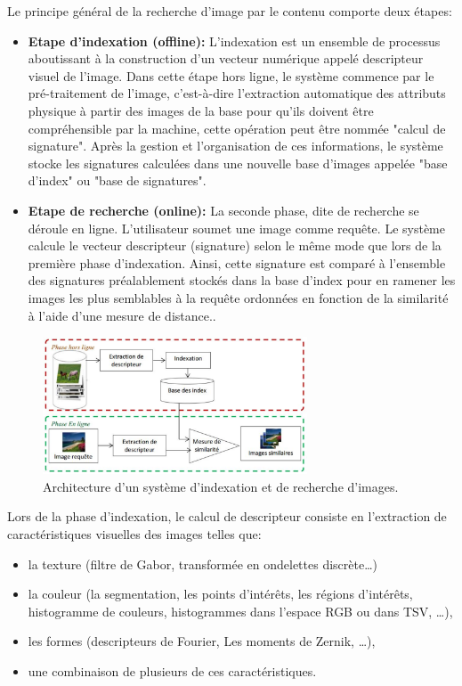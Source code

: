 Le principe général de la recherche d'image par le contenu comporte deux étapes:
\begin{itemize}
	\item  \textbf{Etape d'indexation (offline):} L'indexation est un ensemble de processus aboutissant à la
	construction d’un vecteur numérique appelé descripteur visuel de l’image.
	Dans cette étape hors ligne, le système commence	par le pré-traitement de l'image, c’est-à-dire l'extraction automatique des	attributs physique à partir des images de la base pour qu'ils doivent être compréhensible par la machine, cette opération peut être nommée "calcul de signature". Après la gestion et l'organisation de ces informations, le système stocke les signatures calculées dans une nouvelle base d'images appelée "base d'index" ou "base de signatures".
	
	\item \textbf{Etape de recherche (online):} La seconde phase, dite de recherche se déroule en ligne. L'utilisateur soumet une image comme requête. Le système calcule le vecteur descripteur (signature)  selon le même mode que lors de la première phase d'indexation. Ainsi, cette signature est comparé à l'ensemble des signatures préalablement stockés dans la base d'index pour en ramener les images les plus semblables à la requête ordonnées en fonction de la similarité à l’aide d’une mesure de distance..
\end{itemize}

\begin{figure}[H]
	    \label{fig:cbir_principe}
		\centering
		\includegraphics[width=0.7\textwidth]{Figures/cbir_principe} %
		\caption{ Architecture d'un système d'indexation et de recherche d'images.}
\end{figure}

Lors de la phase d'indexation, le calcul de descripteur consiste en l'extraction de caractéristiques visuelles des images telles que:
\begin{itemize}
	\item la texture (filtre de Gabor, transformée en ondelettes discrète…)
	\item la couleur (la segmentation, les points d’intérêts, les régions d’intérêts,
	histogramme de couleurs, histogrammes dans l'espace RGB ou dans TSV, …),
	\item les formes (descripteurs de Fourier, Les moments de Zernik, …),
	\item une combinaison de plusieurs de ces caractéristiques.
\end{itemize}

